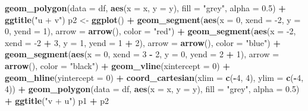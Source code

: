 \documentclass[
]{book}
\newenvironment{Shaded}{\begin{snugshade}}{\end{snugshade}}
\newcommand{\DataTypeTok}[1]{\textcolor[rgb]{0.13,0.29,0.53}{#1}}
\newcommand{\DecValTok}[1]{\textcolor[rgb]{0.00,0.00,0.81}{#1}}
\newcommand{\FloatTok}[1]{\textcolor[rgb]{0.00,0.00,0.81}{#1}}
\newcommand{\KeywordTok}[1]{\textcolor[rgb]{0.13,0.29,0.53}{\textbf{#1}}}
\newcommand{\NormalTok}[1]{#1}
\newcommand{\OperatorTok}[1]{\textcolor[rgb]{0.81,0.36,0.00}{\textbf{#1}}}
\newcommand{\StringTok}[1]{\textcolor[rgb]{0.31,0.60,0.02}{#1}}
\theoremstyle{definition}
\theoremstyle{definition}
\theoremstyle{definition}
\theoremstyle{remark}
\begin{document}
\begin{Shaded}
\begin{Highlighting}[]
\StringTok{    }\KeywordTok{geom_polygon}\NormalTok{(}\DataTypeTok{data =}\NormalTok{ df, }\KeywordTok{aes}\NormalTok{(}\DataTypeTok{x =}\NormalTok{ x, }\DataTypeTok{y =}\NormalTok{ y), }\DataTypeTok{fill =} \StringTok{"grey"}\NormalTok{, }\DataTypeTok{alpha =} \FloatTok{0.5}\NormalTok{) }\OperatorTok{+}
\StringTok{    }\KeywordTok{ggtitle}\NormalTok{(}\StringTok{"u + v"}\NormalTok{)}
\NormalTok{p2 <-}\StringTok{ }\KeywordTok{ggplot}\NormalTok{() }\OperatorTok{+}
\StringTok{    }\KeywordTok{geom_segment}\NormalTok{(}\KeywordTok{aes}\NormalTok{(}\DataTypeTok{x =} \DecValTok{0}\NormalTok{, }\DataTypeTok{xend =} \DecValTok{-2}\NormalTok{, }\DataTypeTok{y =} \DecValTok{0}\NormalTok{, }\DataTypeTok{yend =} \DecValTok{1}\NormalTok{), }\DataTypeTok{arrow =} \KeywordTok{arrow}\NormalTok{(), }\DataTypeTok{color =} \StringTok{"red"}\NormalTok{) }\OperatorTok{+}
\StringTok{    }\KeywordTok{geom_segment}\NormalTok{(}\KeywordTok{aes}\NormalTok{(}\DataTypeTok{x =} \DecValTok{-2}\NormalTok{, }\DataTypeTok{xend =} \DecValTok{-2} \OperatorTok{+}\StringTok{ }\DecValTok{3}\NormalTok{, }\DataTypeTok{y =} \DecValTok{1}\NormalTok{, }\DataTypeTok{yend =} \DecValTok{1} \OperatorTok{+}\StringTok{ }\DecValTok{2}\NormalTok{), }\DataTypeTok{arrow =} \KeywordTok{arrow}\NormalTok{(), }\DataTypeTok{color =} \StringTok{"blue"}\NormalTok{) }\OperatorTok{+}
\StringTok{    }\KeywordTok{geom_segment}\NormalTok{(}\KeywordTok{aes}\NormalTok{(}\DataTypeTok{x =} \DecValTok{0}\NormalTok{, }\DataTypeTok{xend =} \DecValTok{3} \OperatorTok{-}\StringTok{ }\DecValTok{2}\NormalTok{, }\DataTypeTok{y =} \DecValTok{0}\NormalTok{, }\DataTypeTok{yend =} \DecValTok{2} \OperatorTok{+}\StringTok{ }\DecValTok{1}\NormalTok{), }\DataTypeTok{arrow =} \KeywordTok{arrow}\NormalTok{(), }\DataTypeTok{color =} \StringTok{"black"}\NormalTok{) }\OperatorTok{+}
\StringTok{    }\KeywordTok{geom_vline}\NormalTok{(}\DataTypeTok{xintercept =} \DecValTok{0}\NormalTok{) }\OperatorTok{+}\StringTok{ }
\StringTok{    }\KeywordTok{geom_hline}\NormalTok{(}\DataTypeTok{yintercept =} \DecValTok{0}\NormalTok{) }\OperatorTok{+}
\StringTok{    }\KeywordTok{coord_cartesian}\NormalTok{(}\DataTypeTok{xlim =} \KeywordTok{c}\NormalTok{(}\OperatorTok{-}\DecValTok{4}\NormalTok{, }\DecValTok{4}\NormalTok{), }\DataTypeTok{ylim =} \KeywordTok{c}\NormalTok{(}\OperatorTok{-}\DecValTok{4}\NormalTok{, }\DecValTok{4}\NormalTok{)) }\OperatorTok{+}
\StringTok{    }\KeywordTok{geom_polygon}\NormalTok{(}\DataTypeTok{data =}\NormalTok{ df, }\KeywordTok{aes}\NormalTok{(}\DataTypeTok{x =}\NormalTok{ x, }\DataTypeTok{y =}\NormalTok{ y), }\DataTypeTok{fill =} \StringTok{"grey"}\NormalTok{, }\DataTypeTok{alpha =} \FloatTok{0.5}\NormalTok{) }\OperatorTok{+}
\StringTok{    }\KeywordTok{ggtitle}\NormalTok{(}\StringTok{"v + u"}\NormalTok{)}
\NormalTok{p1 }\OperatorTok{+}\StringTok{ }\NormalTok{p2}
\end{Highlighting}
\end{Shaded}
\end{document}
